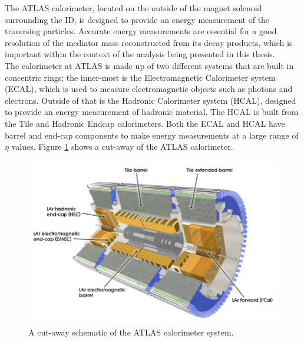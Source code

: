 The ATLAS calorimeter, located on the outside of the magnet solenoid surrounding the ID,
is designed to provide an energy measurement of the traversing particles.
Accurate energy measurements are essential for a good resolution
of the mediator mass reconstructed from its decay products,
which is important within the context of the analysis being presented in this thesis.\\

The calorimeter at ATLAS is made up of two different systems that are built in concentric rings;
the inner-most is the Electromagnetic Calorimeter system (ECAL), which is used to measure electromagnetic objects such as photons and electrons.
Outside of that is the Hadronic Calorimeter system (HCAL), designed to provide an energy measurement of hadronic material.
The HCAL is built from the Tile and Hadronic Endcap calorimeters.
Both the ECAL and HCAL have barrel and end-cap components to make energy measurements at a large range of $\eta$ values.
Figure \ref{fig:det-calo_schem} shows a cut-away of the ATLAS calorimeter.\\

\begin{figure}[!ht]
  \begin{center}
    \includegraphics[width=1\linewidth, angle=0]{figs/Detector/Calo_schem.png}
  \end{center}
  \caption{
    A cut-away schematic of the ATLAS calorimeter system.}
  \label{fig:det-calo_schem}
\end{figure}

